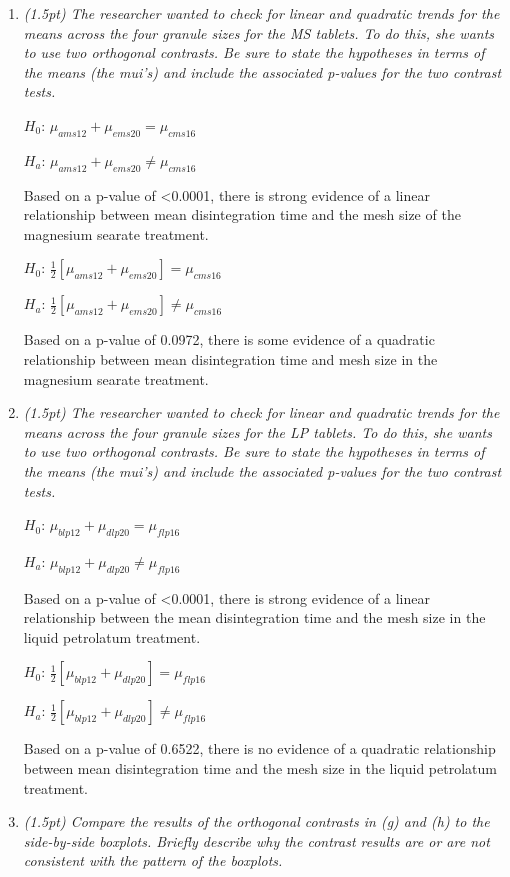 \documentclass{article}\usepackage[]{graphicx}\usepackage[]{color}
\begin{document}
\begin{enumerate}
\begin{enumerate}
\item 
{\it  (1.5pt) The researcher wanted to check for linear and quadratic trends for the means across the four granule sizes for the MS tablets. To do this, she wants to use two orthogonal contrasts. Be sure to state the hypotheses in terms of the means (the mui's) and include the associated p-values for the two contrast tests.}

$H_{0}$: $\mu_{ams12} + \mu_{ems20} = \mu_{cms16}$

$H_{a}$: $\mu_{ams12} + \mu_{ems20} \neq \mu_{cms16}$ 

Based on a p-value of \textless 0.0001, there is strong evidence of a linear relationship between mean disintegration time and the mesh size of the magnesium searate treatment.

$H_{0}$: $\frac{1}{2}[\mu_{ams12} + \mu_{ems20}] = \mu_{cms16}$

$H_{a}$: $\frac{1}{2}[\mu_{ams12} + \mu_{ems20}] \neq \mu_{cms16}$ 

Based on a p-value of 0.0972, there is some evidence of a quadratic relationship between mean disintegration time and mesh size in the magnesium searate treatment.


\item
{\it  (1.5pt) The researcher wanted to check for linear and quadratic trends for the means across the four granule sizes for the LP tablets. To do this, she wants to use two orthogonal contrasts. Be sure to state the hypotheses in terms of the means (the mui's) and include the associated p-values for the two contrast tests.}

$H_{0}$: $\mu_{blp12} + \mu_{dlp20} = \mu_{flp16}$

$H_{a}$: $\mu_{blp12} + \mu_{dlp20} \neq \mu_{flp16}$

Based on a p-value of \textless 0.0001, there is strong evidence of a linear relationship between the mean disintegration time and the mesh size in the liquid petrolatum treatment.

$H_{0}$: $\frac{1}{2}[\mu_{blp12} + \mu_{dlp20}] = \mu_{flp16}$

$H_{a}$: $\frac{1}{2}[\mu_{blp12} + \mu_{dlp20}] \neq \mu_{flp16}$

Based on a p-value of 0.6522, there is no evidence of a quadratic relationship between mean disintegration time and the mesh size in the liquid petrolatum treatment. 


\item 
{\it (1.5pt) Compare the results of the orthogonal contrasts in (g) and (h) to the side-by-side boxplots. Briefly describe why the contrast results are or are not consistent with the pattern of the boxplots.}



\end{enumerate}
\end{enumerate}
\end{document}
